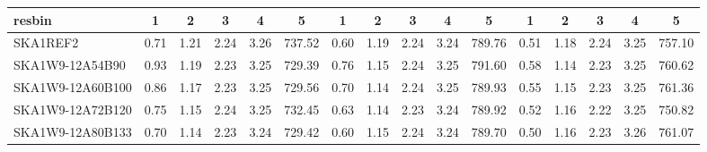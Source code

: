 \begin{table}[H]
{{\begin{tabular}{|lccccc||ccccc||ccccc|}
 resbin  &1 & 2 & 3 & 4 & 5 & 1 & 2 & 3 & 4 & 5 & 1 & 2 & 3 & 4 & 5 \\ \hline
SKA1REF2 & 0.71 \cellcolor{blue!20.51} & 1.21 \cellcolor{red!60.00} & 2.24 \cellcolor{green!60.00} & 3.26 \cellcolor{orange!60.00} & 737.52 \cellcolor{purple!60.00} & 0.60 \cellcolor{blue!18.00} & 1.19 \cellcolor{red!60.00} & 2.24 \cellcolor{green!60.00} & 3.24 \cellcolor{orange!33.98} & 789.76 \cellcolor{purple!19.45} & 0.51 \cellcolor{blue!26.97} & 1.18 \cellcolor{red!60.00} & 2.24 \cellcolor{green!60.00} & 3.25 \cellcolor{orange!26.91} & 757.10 \cellcolor{purple!43.02}\\ \hline 
SKA1W9-12A54B90 & 0.93 \cellcolor{blue!60.00} & 1.19 \cellcolor{red!51.44} & 2.23 \cellcolor{green!18.00} & 3.25 \cellcolor{orange!52.61} & 729.39 \cellcolor{purple!18.00} & 0.76 \cellcolor{blue!60.00} & 1.15 \cellcolor{red!25.19} & 2.24 \cellcolor{green!33.21} & 3.25 \cellcolor{orange!49.22} & 791.60 \cellcolor{purple!60.00} & 0.58 \cellcolor{blue!60.00} & 1.14 \cellcolor{red!18.00} & 2.23 \cellcolor{green!29.70} & 3.25 \cellcolor{orange!32.51} & 760.62 \cellcolor{purple!57.06}\\ \hline 
SKA1W9-12A60B100 & 0.86 \cellcolor{blue!46.93} & 1.17 \cellcolor{red!31.82} & 2.23 \cellcolor{green!21.20} & 3.25 \cellcolor{orange!43.73} & 729.56 \cellcolor{purple!18.87} & 0.70 \cellcolor{blue!45.59} & 1.14 \cellcolor{red!20.53} & 2.24 \cellcolor{green!52.40} & 3.25 \cellcolor{orange!60.00} & 789.93 \cellcolor{purple!23.05} & 0.55 \cellcolor{blue!48.79} & 1.15 \cellcolor{red!30.69} & 2.23 \cellcolor{green!42.30} & 3.25 \cellcolor{orange!18.00} & 761.36 \cellcolor{purple!60.00}\\ \hline 
SKA1W9-12A72B120 & 0.75 \cellcolor{blue!28.19} & 1.15 \cellcolor{red!20.36} & 2.24 \cellcolor{green!55.37} & 3.25 \cellcolor{orange!48.17} & 732.45 \cellcolor{purple!33.81} & 0.63 \cellcolor{blue!25.59} & 1.14 \cellcolor{red!18.00} & 2.23 \cellcolor{green!18.00} & 3.24 \cellcolor{orange!18.00} & 789.92 \cellcolor{purple!22.84} & 0.52 \cellcolor{blue!29.87} & 1.16 \cellcolor{red!41.14} & 2.22 \cellcolor{green!18.00} & 3.25 \cellcolor{orange!28.95} & 750.82 \cellcolor{purple!18.00}\\ \hline 
SKA1W9-12A80B133 & 0.70 \cellcolor{blue!18.00} & 1.14 \cellcolor{red!18.00} & 2.23 \cellcolor{green!41.49} & 3.24 \cellcolor{orange!18.00} & 729.42 \cellcolor{purple!18.11} & 0.60 \cellcolor{blue!18.20} & 1.15 \cellcolor{red!27.89} & 2.24 \cellcolor{green!32.84} & 3.24 \cellcolor{orange!26.92} & 789.70 \cellcolor{purple!18.00} & 0.50 \cellcolor{blue!18.00} & 1.16 \cellcolor{red!45.53} & 2.23 \cellcolor{green!24.60} & 3.26 \cellcolor{orange!60.00} & 761.07 \cellcolor{purple!58.84}\\ \hline 

\end{tabular}}}
\end{table}
